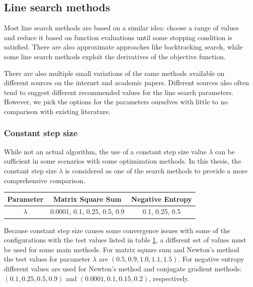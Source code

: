 \documentclass[english, 12pt, a4paper, sci, utf8, a-1b, online, table]{aaltothesis}
\begin{document}
\subsection{Line search methods}
\label{sect:line_search_methods}

Most line search methods are based on a similar idea: choose a range of values and reduce it based on function evaluations until some stopping condition is satisfied. There are also approximate approaches like backtracking search, while some line search methods exploit the derivatives of the objective function.

There are also multiple small variations of the same methods available on different sources on the internet and academic papers. Different sources also often tend to suggest different recommended values for the line search parameters. However, we pick the options for the parameters ourselves with little to no comparison with existing literature. \cite{book:convex_optimization} \cite{book:nonlinear_programming} 


\subsubsection{Constant step size}


While not an actual algorithm, the use of a constant step size value $\lambda$ can be sufficient in some scenarios with some optimization methods. In this thesis, the constant step size $\lambda$ is considered as one of the search methods to provide a more comprehensive comparison.

\begin{table}[H]
\label{tab:params_ConstantSearch}
\centering
{}
\begin{tabular}{|c|c|c|}
\hline
\rowcolor{gray!25}
Parameter & Matrix Square Sum & Negative Entropy \\
\hline
$\lambda$ & 0.0001, 0.1, 0.25, 0.5, 0.9 & 0.1, 0.25, 0.5 \\
\hline
\end{tabular}
\end{table}

Because constant step size causes some convergence issues with some of the configurations with the test values listed in table \ref{tab:params_ConstantSearch}, a different set of values must be used for some main methods. For matrix square sum and Newton's method the test values for parameter $\lambda$ are $(0.5, 0.9, 1.0, 1.1, 1.5)$. For negative entropy different values are used for Newton's method and conjugate gradient methods: $(0.1, 0.25, 0.5, 0.9)$ and $(0.0001, 0.1, 0.15, 0.2)$, respectively.
\end{document}
